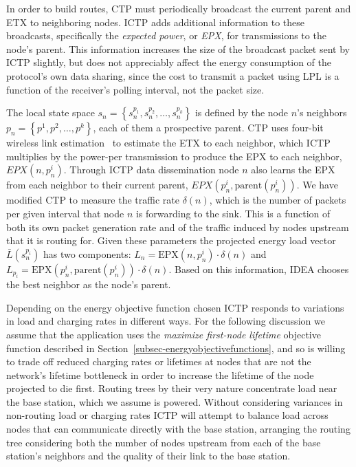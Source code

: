 \vfill\eject

In order to build routes, CTP must periodically broadcast the current parent
and ETX to neighboring nodes. ICTP adds additional information to these
broadcasts, specifically the \textit{expected power}, or \textit{EPX}, for
transmissions to the node's parent. This information increases the size of
the broadcast packet sent by ICTP slightly, but does not appreciably affect
the energy consumption of the protocol's own data sharing, since the cost to
transmit a packet using LPL is a function of the receiver's polling interval,
not the packet size.

The local state space $s_n = \left\{s_n^{p_1}, s_n^{p_2}, \ldots, s_n^{p_k}
\right\}$ is defined by the node $n$'s neighbors $p_n = \left\{p^1, p^2,
\ldots, p^k \right\}$, each of them a prospective parent. CTP uses four-bit
wireless link estimation~\cite{Fonseca07} to estimate the ETX to each
neighbor, which ICTP multiplies by the power-per transmission to produce the
EPX to each neighbor, $EPX(n, p_n^i)$. Through ICTP data dissemination node
$n$ also learns the EPX from each neighbor to their current parent,
$EPX(p_n^i, \textrm{parent}(p_n^i))$. We have modified CTP to measure the
traffic rate $\delta(n)$, which is the number of packets per given interval
that node $n$ is forwarding to the sink. This is a function of both its own
packet generation rate and of the traffic induced by nodes upstream that it
is routing for. Given these parameters the projected energy load vector
$\bar{L}(s_n^{p_i})$ has two components: $L_n = \textrm{EPX}(n, p_n^i) \cdot
\delta(n)$ and $L_{p_i} = \textrm{EPX}(p_n^i, \textrm{parent}(p_n^i)) \cdot
\delta(n)$. Based on this information, IDEA chooses the best neighbor as the
node's parent.

Depending on the energy objective function chosen ICTP responds to variations
in load and charging rates in different ways. For the following discussion we
assume that the application uses the \textit{maximize first-node lifetime}
objective function described in
Section~\ref{subsec-energyobjectivefunctions}, and so is willing to trade off
reduced charging rates or lifetimes at nodes that are not the network's
lifetime bottleneck in order to increase the lifetime of the node projected
to die first. Routing trees by their very nature concentrate load near the
base station, which we assume is powered. Without considering variances in
non-routing load or charging rates ICTP will attempt to balance load across
nodes that can communicate directly with the base station, arranging the
routing tree considering both the number of nodes upstream from each of the
base station's neighbors and the quality of their link to the base station.

